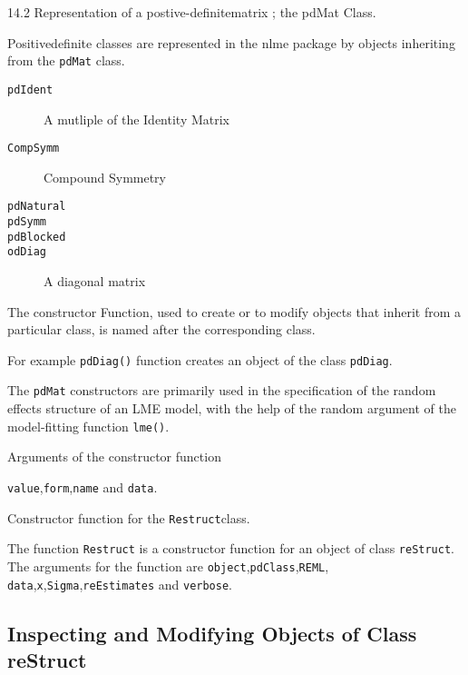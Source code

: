 

14.2 Representation of a postive-definitematrix ; the pdMat Class.

Positivedefinite classes are represented in the nlme package by objects inheriting from the \texttt{pdMat} class.

\begin{description}
\item[\texttt{pdIdent}] A mutliple of the Identity Matrix
\item[\texttt{CompSymm}] Compound Symmetry
\item[\texttt{pdNatural}] 
\item[\texttt{pdSymm}]
\item[\texttt{pdBlocked}]
\item[\texttt{odDiag}] A diagonal matrix
\end{description}


The constructor Function, used to create or to modify objects that inherit from a particular class, is named after the corresponding class.

For example \texttt{pdDiag()} function creates an object of the class \texttt{pdDiag}.

The \texttt{pdMat} constructors are primarily used in the specification of the random effects structure of an LME model, with the help of the random argument of the model-fitting function \texttt{lme()}.


Arguments of the constructor function

\texttt{value},\texttt{form},\texttt{name} and \texttt{data}.



Constructor function for the \texttt{Restruct}class.

The function \texttt{Restruct} is a constructor function for an object of class \texttt{reStruct}.
The arguments for the function are \texttt{object},\texttt{pdClass},\texttt{REML}, \texttt{data},\texttt{x},\texttt{Sigma},\texttt{reEstimates} and \texttt{verbose}.

\subsection*{Inspecting and Modifying Objects of Class reStruct}

